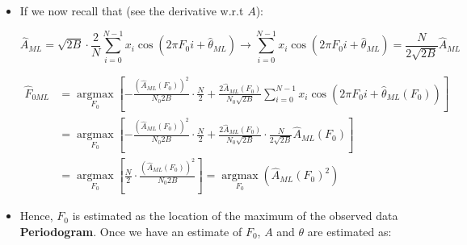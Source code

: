 \begin{itemize}
\[
\hat{F}_{0ML} = \underset{F_0}{\operatorname{argmax}}\, C(F_0) 
= \underset{F_0}{\operatorname{argmax}}\, \ln L\left(\hat{A}_{ML}(F_0), \hat{\theta}_{ML}(F_0), F_0\right)
= \underset{F_0}{\operatorname{argmax}} \left[
    -\frac{\left(\hat{A}_{ML}(F_0)\right)^2}{N_0 2B} \cdot \frac{N}{2}
    + \frac{2\hat{A}_{ML}(F_0)}{N_0 \sqrt{2B}} \sum_{i=0}^{N-1} x_i \cos\left(2\pi F_0 i + \hat{\theta}_{ML}(F_0)\right)
\right]
\]
    \item If we now recall that (see the derivative w.r.t \(A\)):

\[
\hat{A}_{ML} = \sqrt{2B} \cdot \frac{2}{N} \sum_{i=0}^{N-1} x_i \cos\left(2\pi F_0 i + \hat{\theta}_{ML}\right)
\longrightarrow
\sum_{i=0}^{N-1} x_i \cos\left(2\pi F_0 i + \hat{\theta}_{ML}\right)
= \frac{N}{2\sqrt{2B}} \hat{A}_{ML}
\]

\[
\begin{aligned}
    \hat{F}_{0ML} 
    &= \underset{F_0}{\operatorname{argmax}} \left[
        -\frac{\left(\hat{A}_{ML}(F_0)\right)^2}{N_0 2B} \cdot \frac{N}{2}
        + \frac{2\hat{A}_{ML}(F_0)}{N_0 \sqrt{2B}} \sum_{i=0}^{N-1} x_i \cos\left(2\pi F_0 i + \hat{\theta}_{ML}(F_0)\right)
    \right] \\[2em]
    &= \underset{F_0}{\operatorname{argmax}} \left[
        -\frac{\left(\hat{A}_{ML}(F_0)\right)^2}{N_0 2B} \cdot \frac{N}{2}
        + \frac{2\hat{A}_{ML}(F_0)}{N_0 \sqrt{2B}} \cdot \frac{N}{2\sqrt{2B}} \hat{A}_{ML}(F_0)
    \right] \\[2em]
    &= \underset{F_0}{\operatorname{argmax}} \left[
        \frac{N}{2} \cdot \frac{(\hat{A}_{ML}(F_0))^2}{N_0 2B}
    \right]
    = \underset{F_0}{\operatorname{argmax}} \left( \hat{A}_{ML}(F_0)^2 \right)
\end{aligned}
\]
    \item Hence, \(F_0\) is estimated as the location of the maximum of the observed data \textbf{Periodogram}. Once we have an estimate of \(F_0\), \(A\) and \(\theta\) are estimated as:
    


\end{itemize}

